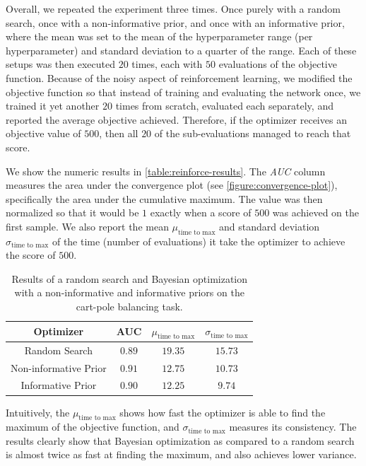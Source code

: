 Overall, we repeated the experiment three times. Once purely with a random search, once with a non-informative prior, and once with an informative prior, where the mean was set to the mean of the hyperparameter range (per hyperparameter) and standard deviation to a quarter of the range. Each of these setups was then executed $20$ times, each with $50$ evaluations of the objective function. Because of the noisy aspect of reinforcement learning, we modified the objective function so that instead of training and evaluating the network once, we trained it yet another $20$ times from scratch, evaluated each separately, and reported the average objective achieved. Therefore, if the optimizer receives an objective value of $500$, then all $20$ of the sub-evaluations managed to reach that score.

We show the numeric results in \autoref{table:reinforce-results}. The \emph{AUC} column measures the area under the convergence plot (see \autoref{figure:convergence-plot}), specifically the area under the cumulative maximum. The value was then normalized so that it would be $1$ exactly when a score of $500$ was achieved on the first sample. We also report the mean $\mu_{\text{time to max}}$ and standard deviation $\sigma_{\text{time to max}}$ of the time (number of evaluations) it take the optimizer to achieve the score of $500$.

\begin{table}[t]
	\begin{center}
		\begin{tabular}{||c c c c||} 
			\hline
			Optimizer & AUC & $\mu_{\text{time to max}}$ & $\sigma_{\text{time to max}}$ \\ [0.5ex] 
			\hline\hline
			Random Search & $0.89$ & $19.35$ & $15.73$ \\ 
			\hline
			Non-informative Prior & $0.91$ & $12.75$ & $10.73$ \\
			\hline
			Informative Prior & $0.90$ & $12.25$ & $9.74$  \\
			\hline
		\end{tabular}
		\caption{Results of a random search and Bayesian optimization with a non-informative and informative priors on the cart-pole balancing task.}
		\label{table:reinforce-results}
	\end{center}
\end{table}

Intuitively, the $\mu_{\text{time to max}}$ shows how fast the optimizer is able to find the maximum of the objective function, and $\sigma_{\text{time to max}}$ measures its consistency. The results clearly show that Bayesian optimization as compared to a random search is almost twice as fast at finding the maximum, and also achieves lower variance.

